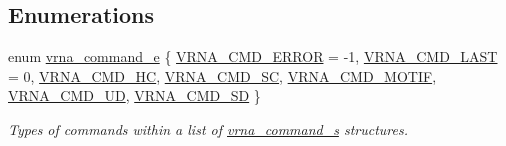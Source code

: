 \subsection*{Enumerations}
\begin{DoxyCompactItemize}
\item 
enum \mbox{\hyperlink{group__file__utils_ga2ea3e452bf3b3f3ca513b3b081a86137}{vrna\+\_\+command\+\_\+e}} \{ \newline
\mbox{\hyperlink{group__file__utils_gga2ea3e452bf3b3f3ca513b3b081a86137a3c0a225034da3be5566da27701106896}{V\+R\+N\+A\+\_\+\+C\+M\+D\+\_\+\+E\+R\+R\+OR}} = -\/1, 
\mbox{\hyperlink{group__file__utils_gga2ea3e452bf3b3f3ca513b3b081a86137a6a856bc3495c61ccf9c3cd4fd8eb148c}{V\+R\+N\+A\+\_\+\+C\+M\+D\+\_\+\+L\+A\+ST}} = 0, 
\mbox{\hyperlink{group__file__utils_gga2ea3e452bf3b3f3ca513b3b081a86137afce8f1dd47f4eeb20010b1dbffa1a388}{V\+R\+N\+A\+\_\+\+C\+M\+D\+\_\+\+HC}}, 
\mbox{\hyperlink{group__file__utils_gga2ea3e452bf3b3f3ca513b3b081a86137a1083bb6aca26bb24de0a66739974e87a}{V\+R\+N\+A\+\_\+\+C\+M\+D\+\_\+\+SC}}, 
\newline
\mbox{\hyperlink{group__file__utils_gga2ea3e452bf3b3f3ca513b3b081a86137a3eb2d309976ff8a8910a747bc9994899}{V\+R\+N\+A\+\_\+\+C\+M\+D\+\_\+\+M\+O\+T\+IF}}, 
\mbox{\hyperlink{group__file__utils_gga2ea3e452bf3b3f3ca513b3b081a86137adc843a9673ba5ee6e2bff4877c911010}{V\+R\+N\+A\+\_\+\+C\+M\+D\+\_\+\+UD}}, 
\mbox{\hyperlink{group__file__utils_gga2ea3e452bf3b3f3ca513b3b081a86137aab834c524f6a3d4b51dd5a5f132471b9}{V\+R\+N\+A\+\_\+\+C\+M\+D\+\_\+\+SD}}
 \}
\begin{DoxyCompactList}\small\item\em Types of commands within a list of \mbox{\hyperlink{group__file__utils_structvrna__command__s}{vrna\+\_\+command\+\_\+s}} structures. \end{DoxyCompactList}\end{DoxyCompactItemize}
